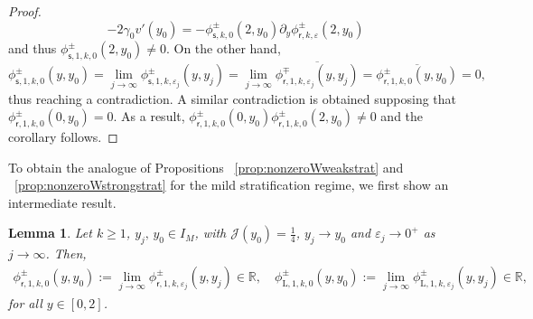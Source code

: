 \documentclass[11pt,reqno]{amsproc}
\newtheorem{lemma}[proposition]{Lemma}
\theoremstyle{definition}
\numberwithin{equation}{section}
\newcommand{\rL}{{\mathrm{L}}}
\newcommand{\cJ}{{\mathcal{J}}}
\newcommand{\R}{{\mathbb R}}
\newcommand{\sr}{{\mathsf{r}}}
\newcommand{\s}{{\mathsf{s}}}
\newcommand{\ep}{\varepsilon}
\begin{document}
\begin{proof}
\begin{equation*}
-2\gamma_0v'(y_0) = -\phi_{\s,k,0}^\pm(2,y_0)\partial_y\phi_{\sr,k,\ep}^\pm(2,y_0)
\end{equation*}
and thus $\phi_{\s,1,k,0}^\pm(2,y_0)\neq 0$. On the other hand,
\begin{equation*}
\phi_{\s,1,k,0}^\pm(y,y_0) = \lim_{j\rightarrow \infty} \phi_{\s,1,k,\ep_j}^\pm(y,y_j) = \lim_{j\rightarrow \infty} \overline{\phi_{\sr,1,k,\ep_j}^\mp(y,y_j)} = \overline{\phi_{\sr,1,k,0}^\pm(y,y_0)}=0,
\end{equation*}
thus reaching a contradiction. A similar contradiction is obtained supposing that $\phi_{\sr,1,k,0}^\pm(0,y_0) = 0$. As a result, $\phi_{\sr,1,k,0}^\pm(0,y_0)\phi_{\sr,1,k,0}^\pm(2,y_0)\neq 0$ and the corollary follows.
\end{proof}

To obtain the analogue of Propositions ~\ref{prop:nonzeroWweakstrat} and ~\ref{prop:nonzeroWstrongstrat} for the mild stratification regime, we first show an intermediate result.

\begin{lemma}\label{lemma:realphirphirL}
Let $k\geq 1$, $y_j,\,y_0\in I_M$, with $\cJ(y_0)=\frac14$, $y_j\rightarrow y_0$ and $\ep_j\rightarrow 0^+$ as $j\rightarrow \infty$. Then,
\begin{align*}
\phi_{\sr,1,k,0}^\pm(y,y_0):= \lim_{j\rightarrow \infty}\phi_{\sr,1,k,\ep_j}^\pm(y,y_j) \in \R, \quad \phi_{\rL,1,k,0}^\pm(y,y_0):= \lim_{j\rightarrow \infty}\phi_{\rL,1,k,\ep_j}^\pm(y,y_j) \in \R, 
\end{align*}
for all $y\in [0,2]$.
\end{lemma}
\end{document}
